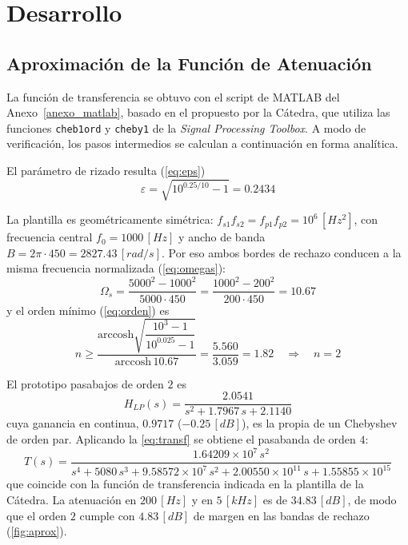 \section{Desarrollo}
\label{sec_3}

\subsection{Aproximación de la Función de Atenuación}
\label{sec_3.1}
La función de transferencia se obtuvo con el script de MATLAB del Anexo~\ref{anexo_matlab}, basado en el propuesto por la Cátedra, que utiliza las funciones \texttt{cheb1ord} y \texttt{cheby1} de la \textit{Signal Processing Toolbox}. A modo de verificación, los pasos intermedios se calculan a continuación en forma analítica.

El parámetro de rizado resulta (\autoref{eq:eps})
\begin{equation}
    \varepsilon = \sqrt{10^{0.25/10} - 1} = 0.2434
\end{equation}

La plantilla es geométricamente simétrica: $f_{s1} f_{s2} = f_{p1} f_{p2} = 10^6 \, [Hz^2]$, con frecuencia central $f_0 = 1000 \, [Hz]$ y ancho de banda $B = 2\pi \cdot 450 = 2827.43 \, [rad/s]$. Por eso ambos bordes de rechazo conducen a la misma frecuencia normalizada (\autoref{eq:omegas}):
\begin{equation}
    \Omega_s = \frac{5000^2 - 1000^2}{5000 \cdot 450} = \frac{1000^2 - 200^2}{200 \cdot 450} = 10.67
\end{equation}
y el orden mínimo (\autoref{eq:orden}) es
\begin{equation}
    n \geq \frac{\mathrm{arccosh}\sqrt{\dfrac{10^{3} - 1}{10^{0.025} - 1}}}{\mathrm{arccosh} \, 10.67} = \frac{5.560}{3.059} = 1.82 \quad \Rightarrow \quad n = 2
\end{equation}

El prototipo pasabajos de orden $2$ es
\begin{equation}
    H_{LP}(s) = \frac{2.0541}{s^2 + 1.7967 \, s + 2.1140}
\end{equation}
cuya ganancia en continua, $0.9717$ ($-0.25 \, [dB]$), es la propia de un Chebyshev de orden par. Aplicando la \autoref{eq:transf} se obtiene el pasabanda de orden $4$:
\begin{equation}
    T(s) = \frac{1.64209 \times 10^{7} \, s^2}{s^4 + 5080 \, s^3 + 9.58572 \times 10^{7} \, s^2 + 2.00550 \times 10^{11} \, s + 1.55855 \times 10^{15}}
    \label{eq:T}
\end{equation}
que coincide con la función de transferencia indicada en la plantilla de la Cátedra. La atenuación en $200 \, [Hz]$ y en $5 \, [kHz]$ es de $34.83 \, [dB]$, de modo que el orden $2$ cumple con $4.83 \, [dB]$ de margen en las bandas de rechazo (\autoref{fig:aprox}).

